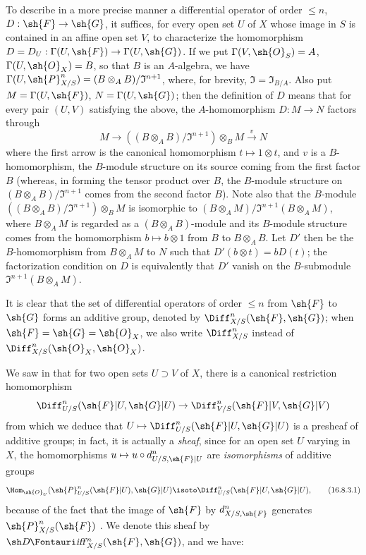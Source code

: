 \begin{env}[16.8.2]
\label{IV.16.8.2}
To describe in a more precise manner a differential operator of order $\leq n$, $D: \sh{F} \to \sh{G}$, it suffices, for every open set $U$ of $X$ whose image in $S$ is contained in an affine open set $V$, to characterize the homomorphism $D = D_U: \Gamma(U, \sh{F}) \to \Gamma(U, \sh{G})$.
If we put $\Gamma(V, \sh{O}_S) = A$, $\Gamma(U, \sh{O}_X) = B$, so that $B$ is an $A$-algebra, we have $\Gamma(U, \sh{P}_{X/S}^n) = (B \otimes_A B)/\mathfrak{I}^{n+1}$, where, for brevity, $\mathfrak{I} = \mathfrak{I}_{B/A}$. 
Also put $M = \Gamma(U, \sh{F})$, $N = \Gamma(U, \sh{G})$;
then the definition of $D$ means that for every pair $(U,V)$ satisfying the above, the $A$-homomorphism $D:M \to N$ factors through
\[
  M \to ((B \otimes_A B)/\mathfrak{I}^{n+1}) \otimes_B M \xrightarrow{v} N
\]
where the first arrow is the canonical homomorphism $t \mapsto 1 \otimes t$, and $v$ is a $B$-homomorphism, the $B$-module structure on its source coming from the first factor $B$ (whereas, in forming the tensor product over $B$, the $B$-module structure on $(B \otimes_A B)/\mathfrak{I}^{n+1}$ comes from the second factor $B$).
Note also that the $B$-module $((B \otimes_A B)/\mathfrak{I}^{n+1}) \otimes_B M$ is isomorphic to $(B \otimes_A M)/\mathfrak{I}^{n+1}(B \otimes_A M)$, where $B \otimes_A M$ is regarded as a $(B \otimes_A B)$-module and its $B$-module structure comes from the homomorphism $b \mapsto b \otimes 1$ from $B$ to $B \otimes_A B$.  
Let $D'$ then be the $B$-homomorphism from $B \otimes_A M$ to $N$ such that $D'(b \otimes t) = bD(t)$; the factorization condition on $D$ is equivalently that $D'$ vanish on the $B$-submodule $\mathfrak{I}^{n+1}(B \otimes_A M)$.
\end{env}

\begin{env}[16.8.3]
\label{IV.16.8.3}
It is clear that the set of differential operators of order $\leq n$ from $\sh{F}$ to $\sh{G}$ forms an additive group, denoted by $\Diff_{X/S}^n(\sh{F}, \sh{G})$;
when $\sh{F} = \sh{G} = \sh{O}_X$, we also write $\Diff_{X/S}^n$ instead of $\Diff_{X/S}^n(\sh{O}_X, \sh{O}_X)$.

We saw in  that for two open sets $U \supset V$ of $X$, there is a canonical restriction homomorphism
\[
  \Diff_{U/S}^n(\sh{F}|U, \sh{G}|U) \to \Diff_{V/S}^n(\sh{F}|V, \sh{G}|V)
\]
from which we deduce that $U \mapsto \Diff_{U/S}^n(\sh{F}|U, \sh{G}|U)$ is a presheaf of additive groups;
in fact, it is actually a \emph{sheaf}, since for an open set $U$ varying in $X$, the homomorphisms $u \mapsto u \circ d_{U/S, \sh{F}|U}^n$ are \emph{isomorphisms} of additive groups
\[
  \label{IV.16.8.3.1}
  \Hom_{\sh{O}_U}(\sh{P}_{U/S}^n(\sh{F}|U), \sh{G}|U) \isoto \Diff_{U/S}^n(\sh{F}|U, \sh{G}|U),
  \tag{16.8.3.1}
\]
because of the fact that the image of $\sh{F}$ by $d_{X/S, \sh{F}}^n$ generates $\sh{P}_{X/S}^n(\sh{F})$ .
We denote this sheaf by $\shDiff_{X/S}^n(\sh{F}, \sh{G})$, and we have:
\end{env}

